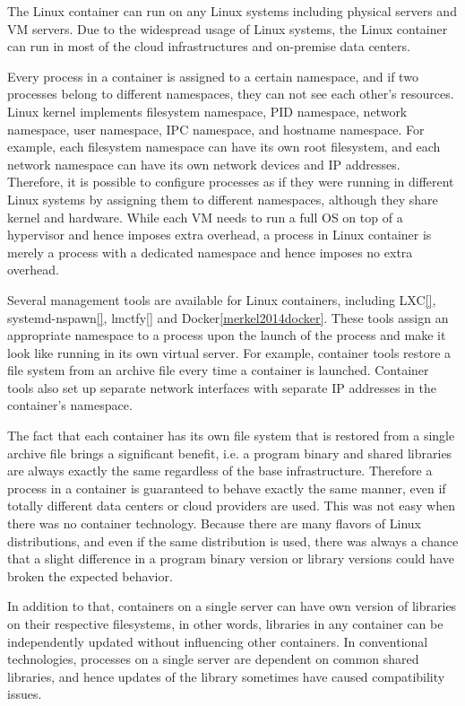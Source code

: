 The Linux container can run on any Linux systems including physical servers and VM servers.
Due to the widespread usage of Linux systems, the Linux container can run in most of the cloud infrastructures and on-premise data centers.

Every process in a container is assigned to a certain namespace, and if two processes belong to different namespaces, they can not see each other's resources. 
Linux kernel implements filesystem namespace, PID namespace, network namespace, user namespace, IPC namespace, and hostname namespace. 
For example, each filesystem namespace can have its own root filesystem, and each network namespace can have its own network devices and IP addresses.
Therefore, it is possible to configure processes as if they were running in different Linux systems by assigning them to different namespaces, although they share kernel and hardware.
While each VM needs to run a full OS on top of a hypervisor and hence imposes extra overhead, a process in Linux container is merely a process with a dedicated namespace and hence imposes no extra overhead.

Several management tools are available for Linux containers, including LXC\ref{}, systemd-nspawn\ref{}, lmctfy\ref{} and Docker\ref{merkel2014docker}.
These tools assign an appropriate namespace to a process upon the launch of the process and make it look like running in its own virtual server.
For example, container tools restore a file system from an archive file every time a container is launched. 
Container tools also set up separate network interfaces with separate IP addresses in the container's namespace.

The fact that each container has its own file system that is restored from a single archive file brings a significant benefit, i.e. a program binary and shared libraries are always exactly the same regardless of the base infrastructure.
Therefore a process in a container is guaranteed to behave exactly the same manner, even if totally different data centers or cloud providers are used.
This was not easy when there was no container technology.
Because there are many flavors of Linux distributions, and even if the same distribution is used, there was always a chance that a slight difference in a program binary version or library versions could have broken the expected behavior.

In addition to that, containers on a single server can have own version of libraries on their respective filesystems, in other words, libraries in any container can be independently updated without influencing other containers.
In conventional technologies, processes on a single server are dependent on common shared libraries, and hence updates of the library sometimes have caused compatibility issues.

